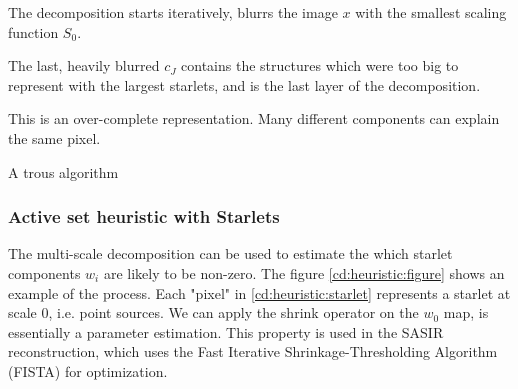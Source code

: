 The decomposition starts iteratively, blurrs the image $x$ with the smallest scaling function $S_0$. 


The last, heavily blurred $c_J$ contains the structures which were too big to represent with the largest starlets, and is the last layer of the decomposition.

This is an over-complete representation. Many different components can explain the same pixel.

A trous algorithm


\subsubsection{Active set heuristic with Starlets}\label{cd:heuristic}

The multi-scale decomposition can be used to estimate the which starlet components $w_i$ are likely to be non-zero. The figure \ref{cd:heuristic:figure} shows an example of the process. Each "pixel" in \ref{cd:heuristic:starlet} represents a starlet at scale 0, i.e. point sources. We can apply the shrink operator on the $w_0$ map, is essentially a parameter estimation. This property is used in the SASIR\cite{girard2015sparse} reconstruction, which uses the Fast Iterative Shrinkage-Thresholding Algorithm (FISTA) for optimization.

